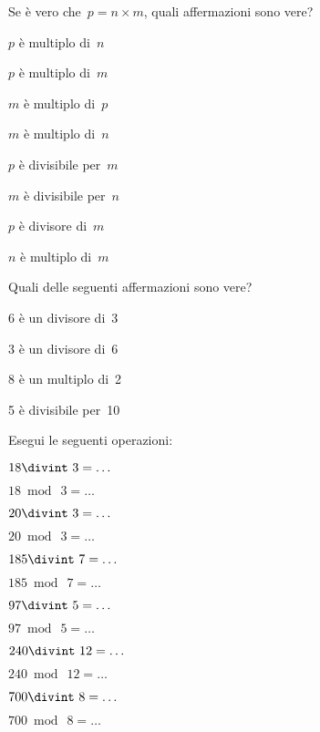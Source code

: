 \begin{esercizio}
 Se è vero che~\(p=n\times m\), quali affermazioni sono vere?
\begin{multicols}{2}
\TabPositions{3.2cm}
\begin{enumeratea}
 \item \(p\) è multiplo di~\(n\)	\tab\boxV\quad\boxF
 \item \(p\) è multiplo di~\(m\)	\tab\boxV\quad\boxF
 \item \(m\) è multiplo di~\(p\)	\tab\boxV\quad\boxF
 \item \(m\) è multiplo di~\(n\)	\tab\boxV\quad\boxF
 \item \(p\) è divisibile per~\(m\)	\tab\boxV\quad\boxF
 \item \(m\) è divisibile per~\(n\)	\tab\boxV\quad\boxF
 \item \(p\) è divisore di~\(m\)	\tab\boxV\quad\boxF
 \item \(n\) è multiplo di~\(m\)	\tab\boxV\quad\boxF
\end{enumeratea}
\end{multicols}
\end{esercizio}

\begin{esercizio}
 Quali delle seguenti affermazioni sono vere?

\begin{multicols}{2}
\TabPositions{3.2cm}
 \begin{enumeratea}
 \item 6 è un divisore di~3 \tab\boxV\quad\boxF
 \item 3 è un divisore di~6 \tab\boxV\quad\boxF
 \item 8 è un multiplo di~2 \tab\boxV\quad\boxF
 \item 5 è divisibile per~10 \tab\boxV\quad\boxF
 \end{enumeratea}
\end{multicols}
\end{esercizio}

\begin{esercizio}
 Esegui le seguenti operazioni:
\begin{multicols}{3}
 \begin{enumeratea}
 \item \(18\divint~3=\ldots\)
 \item \(18\bmod~3=\ldots\)
 \item \(20\divint~3=\ldots\)
 \item \(20\bmod~3=\ldots\)
 \item \(185\divint~7=\ldots\)
 \item \(185\bmod~7=\ldots\)
 \item \(97\divint~5=\ldots\)
 \item \(97\bmod~5=\ldots\)
 \item \(240\divint~12=\ldots\)
 \item \(240\bmod~12=\ldots\)
 \item \(700\divint~8=\ldots\)
 \item \(700\bmod~8=\ldots\)
 \end{enumeratea}
\end{multicols}
\end{esercizio}

